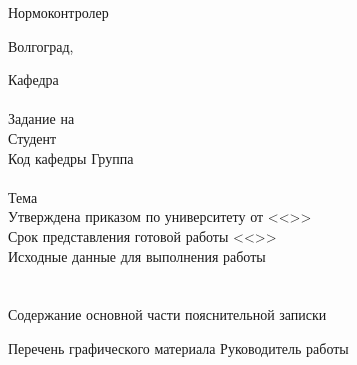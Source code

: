 {    Нормоконтролер 
    \hfill
    \\
    \vspace{\fill}
    \begin{center}
    Волгоград,~\the\year
    \end{center}
    \clearpage
    \thispagestyle{empty}
    \begin{center}
    \VSTUTitleHeading
    \end{center}
    Кафедра~\uline{\VSTUDepartment\hfill}\\
    \vfill
    \hfill\VSTUTitleHeadApproval
    \vspace{\fill}
    \\Задание на \\
    Студент \\
    Код кафедры \uline{\makebox[4cm]{\VSTUDepartmentCode}} \hfill Группа \uline{\makebox[4cm]{\VSTUStudentGroup}}\\
    \vspace{1mm}\\
    Тема \VSTUTitleUL\\
    Утверждена приказом по университету от <<\uline{\makebox[0.5cm]{\VSTUOrderDate}}>> \uline{\makebox[1.8cm]{\VSTUOrderMonth}} \uline{\makebox[1.2cm]{\VSTUOrderYear}} \textnumero\uline{\makebox[2cm]{\VSTUOrderNumber}}\\
    Срок представления готовой работы <<\uline{\makebox[0.5cm]{\VSTUDeadlineDate}}>> \uline{\makebox[2cm]{\VSTUDeadlineMonth}} \uline{\makebox[1.2cm]{\the\year}} \\
    Исходные данные для выполнения работы\\
    \VSTUInitialDataUL\\
    \vspace{4mm}\\
    Содержание основной части пояснительной записки
    {\small
    \VSTUPZContents
    }
    \thispagestyle{empty}
    \addtocounter{page}{-1}
    \noindent Перечень графического материала
    {\small
    \VSTUPZGraphics
    }
    \vspace{\fill}
    \thispagestyle{empty}
    \noindent Руководитель работы 
}
